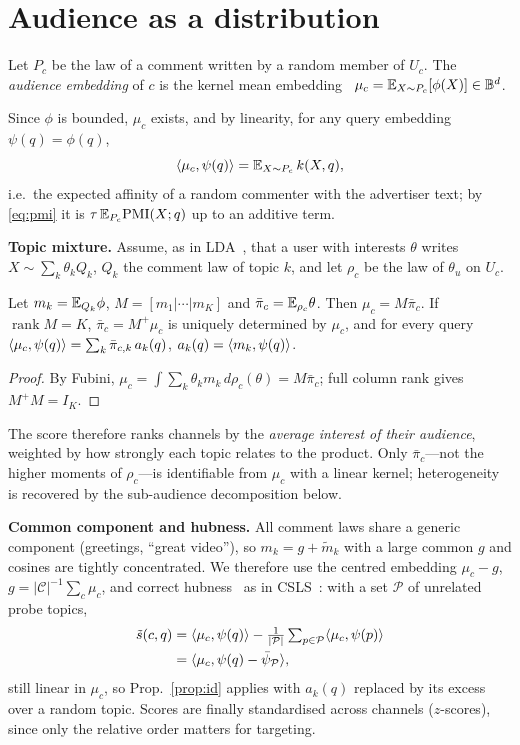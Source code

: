 \documentclass[10pt,twocolumn]{article}
\begin{document}
\section{Audience as a distribution}
\begin{definition}
Let $P_c$ be the law of a comment written by a random member of $U_c$. The \emph{audience embedding} of $c$ is the kernel mean embedding~\cite{smola2007,muandet2017}
$\mu_c=\mathbb{E}_{X\sim P_c}[\phi(X)]\in\mathbb B^d$.
\end{definition}
Since $\phi$ is bounded, $\mu_c$ exists, and by linearity, for any query embedding $\psi(q)=\phi(q)$,
\begin{equation}\label{eq:score}
\langle \mu_c,\psi(q)\rangle=\mathbb{E}_{X\sim P_c}\,k(X,q),
\end{equation}
i.e.\ the expected affinity of a random commenter with the advertiser text; by \eqref{eq:pmi} it is $\tau\,\mathbb{E}_{P_c}\mathrm{PMI}(X;q)$ up to an additive term.

\textbf{Topic mixture.} Assume, as in LDA~\cite{blei2003}, that a user with interests $\theta$ writes $X\sim\sum_k\theta_kQ_k$, $Q_k$ the comment law of topic $k$, and let $\rho_c$ be the law of $\theta_u$ on $U_c$.
\begin{proposition}\label{prop:id}
Let $m_k=\mathbb{E}_{Q_k}\phi$, $M=[m_1|\cdots|m_K]$ and $\bar\pi_c=\mathbb{E}_{\rho_c}\theta$. Then $\mu_c=M\bar\pi_c$. If $\operatorname{rank}M=K$, $\bar\pi_c=M^{+}\mu_c$ is uniquely determined by $\mu_c$, and for every query
$\langle \mu_c,\psi(q)\rangle=\sum_k\bar\pi_{c,k}\,a_k(q)$, $a_k(q)=\langle m_k,\psi(q)\rangle$.
\end{proposition}
\begin{proof}
By Fubini, $\mu_c=\int\!\sum_k\theta_k m_k\,d\rho_c(\theta)=M\bar\pi_c$; full column rank gives $M^+M=I_K$.
\end{proof}
The score therefore ranks channels by the \emph{average interest of their audience}, weighted by how strongly each topic relates to the product. Only $\bar\pi_c$---not the higher moments of $\rho_c$---is identifiable from $\mu_c$ with a linear kernel; heterogeneity is recovered by the sub-audience decomposition below.

\textbf{Common component and hubness.} All comment laws share a generic component (greetings, ``great video''), so $m_k=g+\tilde m_k$ with a large common $g$ and cosines are tightly concentrated. We therefore use the centred embedding $\mu_c-g$, $g=|\mathcal C|^{-1}\sum_c\mu_c$, and correct hubness~\cite{radovanovic2010} as in CSLS~\cite{conneau2018}: with a set $\mathcal P$ of unrelated probe topics,
\begin{align}
\tilde s(c,q)&=\langle \mu_c,\psi(q)\rangle-\tfrac1{|\mathcal P|}\textstyle\sum_{p\in\mathcal P}\langle \mu_c,\psi(p)\rangle\notag\\
&=\langle \mu_c,\psi(q)-\bar\psi_{\mathcal P}\rangle,
\end{align}
still linear in $\mu_c$, so Prop.~\ref{prop:id} applies with $a_k(q)$ replaced by its excess over a random topic. Scores are finally standardised across channels ($z$-scores), since only the relative order matters for targeting.
\end{document}
